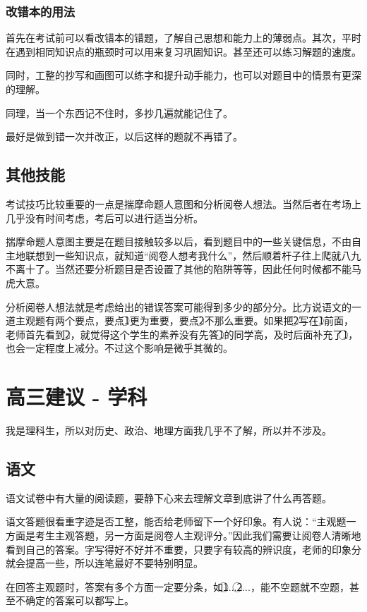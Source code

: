 \documentclass[UTF8,11pt,a4paper]{ctexart}
\begin{document}
			\subsubsection{改错本的用法}
				首先在考试前可以看改错本的错题，了解自己思想和能力上的薄弱点。其次，平时在遇到相同知识点的瓶颈时可以用来复习巩固知识。甚至还可以练习解题的速度。
				
				同时，工整的抄写和画图可以练字和提升动手能力，也可以对题目中的情景有更深的理解。
				
				{\color[gray]{0.6}同理，当一个东西记不住时，多抄几遍就能记住了。}
				
				最好是做到错一次并改正，以后这样的题就不再错了。
		\subsection{其他技能}
			考试技巧比较重要的一点是揣摩命题人意图和分析阅卷人想法。当然后者在考场上几乎没有时间考虑，考后可以进行适当分析。
			
			揣摩命题人意图主要是在题目接触较多以后，看到题目中的一些关键信息，不由自主地联想到一些知识点，就知道“阅卷人想考我什么”，然后顺着杆子往上爬就八九不离十了。当然还要分析题目是否设置了其他的陷阱等等，因此任何时候都不能马虎大意。
			
			分析阅卷人想法就是考虑给出的错误答案可能得到多少的部分分。比方说语文的一道主观题有两个要点，要点\textcircled1更为重要，要点\textcircled2不那么重要。如果把\textcircled2写在\textcircled1前面，老师首先看到\textcircled2，就觉得这个学生的素养没有先答\textcircled1的同学高，及时后面补充了\textcircled1，也会一定程度上减分。不过这个影响是微乎其微的。
	\section{高三建议 - 学科}
		我是理科生，所以对历史、政治、地理方面我几乎不了解，所以并不涉及。
		\subsection{语文}
			语文试卷中有大量的阅读题，要静下心来去理解文章到底讲了什么再答题。
			
			语文答题很看重字迹是否工整，能否给老师留下一个好印象。有人说：“主观题一方面是考生主观答题，另一方面是阅卷人主观评分。”因此我们需要让阅卷人清晰地看到自己的答案。字写得好不好并不重要，只要字有较高的辨识度，老师的印象分就会提高一些，所以连笔最好不要特别明显。
			
			在回答主观题时，答案有多个方面一定要分条，如\textcircled1...\textcircled2...，能不空题就不空题，甚至不确定的答案可以都写上。
			
\end{document}
